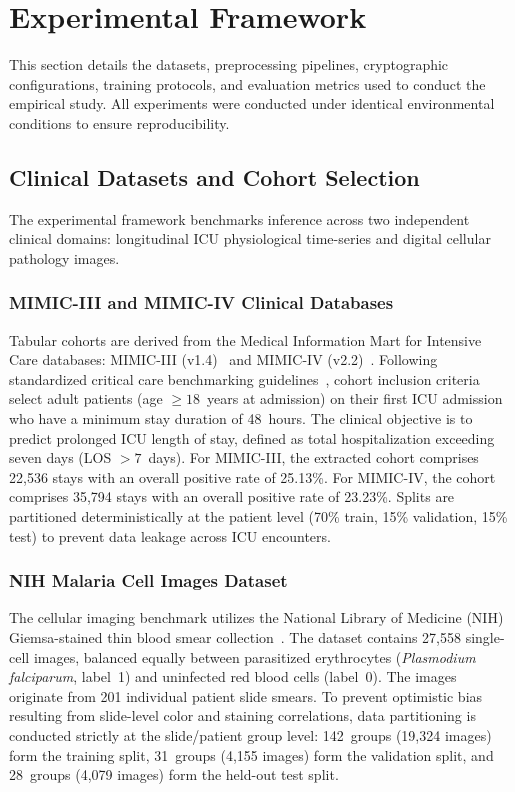 \documentclass[conference]{IEEEtran}
\begin{document}
\section{Experimental Framework}\label{sec:experiment}

This section details the datasets, preprocessing pipelines, cryptographic configurations, training protocols, and evaluation metrics used to conduct the empirical study. All experiments were conducted under identical environmental conditions to ensure reproducibility.

\subsection{Clinical Datasets and Cohort Selection}

The experimental framework benchmarks inference across two independent clinical domains: longitudinal ICU physiological time-series and digital cellular pathology images.

\subsubsection{MIMIC-III and MIMIC-IV Clinical Databases}
Tabular cohorts are derived from the Medical Information Mart for Intensive Care databases: MIMIC-III (v1.4)~\cite{mimiciii2016} and MIMIC-IV (v2.2)~\cite{mimiciv2023}. Following standardized critical care benchmarking guidelines~\cite{harutyunyan2019}, cohort inclusion criteria select adult patients (age $\geq 18$~years at admission) on their first ICU admission who have a minimum stay duration of 48~hours. The clinical objective is to predict prolonged ICU length of stay, defined as total hospitalization exceeding seven days (LOS $> 7$~days). For MIMIC-III, the extracted cohort comprises 22,536 stays with an overall positive rate of 25.13\%. For MIMIC-IV, the cohort comprises 35,794 stays with an overall positive rate of 23.23\%. Splits are partitioned deterministically at the patient level (70\% train, 15\% validation, 15\% test) to prevent data leakage across ICU encounters.

\subsubsection{NIH Malaria Cell Images Dataset}
The cellular imaging benchmark utilizes the National Library of Medicine (NIH) Giemsa-stained thin blood smear collection~\cite{rajaraman2018}. The dataset contains 27,558 single-cell images, balanced equally between parasitized erythrocytes (\textit{Plasmodium falciparum}, label~1) and uninfected red blood cells (label~0). The images originate from 201 individual patient slide smears. To prevent optimistic bias resulting from slide-level color and staining correlations, data partitioning is conducted strictly at the slide/patient group level: 142~groups (19,324 images) form the training split, 31~groups (4,155 images) form the validation split, and 28~groups (4,079 images) form the held-out test split.
\end{document}
